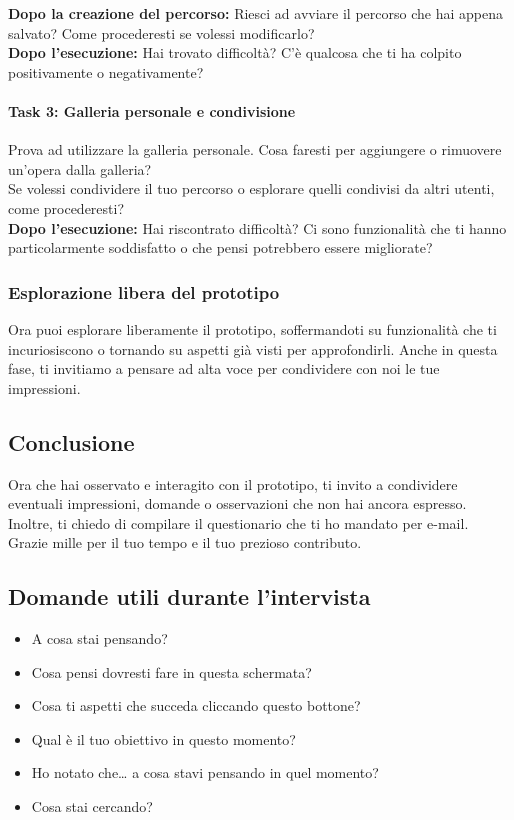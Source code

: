 \documentclass{article}
\begin{document}
\textbf{Dopo la creazione del percorso:} 
Riesci ad avviare il percorso che hai appena salvato? Come procederesti se volessi modificarlo?\\

\textbf{Dopo l'esecuzione:} 
Hai trovato difficoltà? C’è qualcosa che ti ha colpito positivamente o negativamente?

\paragraph*{Task 3: Galleria personale e condivisione}
Prova ad utilizzare la galleria personale. Cosa faresti per aggiungere o rimuovere un’opera dalla galleria?\\

Se volessi condividere il tuo percorso o esplorare quelli condivisi da altri utenti, come procederesti?\\

\textbf{Dopo l'esecuzione:} 
Hai riscontrato difficoltà? Ci sono funzionalità che ti hanno particolarmente soddisfatto o che pensi potrebbero essere migliorate?

\subsubsection{Esplorazione libera del prototipo}
Ora puoi esplorare liberamente il prototipo, soffermandoti su funzionalità che ti incuriosiscono o tornando su aspetti già visti per approfondirli. Anche in questa fase, ti invitiamo a pensare ad alta voce per condividere con noi le tue impressioni.

\subsection{Conclusione}
Ora che hai osservato e interagito con il prototipo, ti invito a condividere eventuali impressioni, domande o osservazioni che non hai ancora espresso. Inoltre, ti chiedo di compilare il questionario che ti ho mandato per e-mail. Grazie mille per il tuo tempo e il tuo prezioso contributo. 

\subsection{Domande utili durante l’intervista}
\begin{itemize}
    \item A cosa stai pensando?
    \item Cosa pensi dovresti fare in questa schermata?
    \item Cosa ti aspetti che succeda cliccando questo bottone?
    \item Qual \`e il tuo obiettivo in questo momento?
    \item Ho notato che… a cosa stavi pensando in quel momento?
    \item Cosa stai cercando?
\end{itemize}
\end{document}
